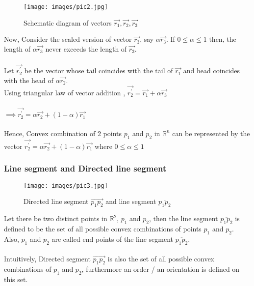 \documentclass{article}
\begin{document}
    \begin{figure}[h]
    \caption{Schematic diagram of vectors $\Vec{r_{1}}, \Vec{r_{2}}, \Vec{r_{3}}$}
    \centering
    \texttt{[image: images/pic2.jpg]}
    \end{figure}

    Now, Consider the scaled version of vector $\Vec{r_{3}}$, say $\alpha \Vec{r_{3}}$. If $0 \leq \alpha \leq 1$ then, the length of $\alpha \Vec{r_{3}}$ never exceeds  the length of $\Vec{r_{3}}$. \\ \\
    Let $\Vec{r^{'}_{2}}$ be the vector whose tail coincides with the tail of $\Vec{r_{1}}$ and head coincides with the head of $\alpha \Vec{r_{2}}$. \\ 
    Using triangular law of vector addition , $\Vec{r^{'}_{2}} = \Vec{r_{1}} + \alpha \Vec{r_{3}}$ \\ \\
    $\implies \Vec{r^{'}_{2}} = \alpha \Vec{r_{2}} + (1 - \alpha) \Vec{r_{1}}$ \\ \\
    Hence, Convex combination of 2 points $p_{1}$ and $p_{2}$ in $\mathbb{R}^{n}$ can be represented by the vector $\Vec{r^{'}_{2}} = \alpha \Vec{r_{2}} + (1 - \alpha) \Vec{r_{1}}$ where $0 \leq \alpha \leq 1$

    \subsubsection{Line segment and Directed line segment}
    
    \begin{figure}[h]
    \caption{Directed line segment $\overrightarrow{p_1p_2}$ and line segment $\overline{p_1p_2}$}
    \centering
    \texttt{[image: images/pic3.jpg]}
    \end{figure}
    
    Let there be two distinct points in $\mathbb{R}^{2}$, $p_{1}$ and $p_{2}$, then the line segment $\overline{p_{1} p_{2}}$ is defined to be the set of all possible convex combinations of points $p_{1}$ and $p_{2}$. Also, $p_{1}$ and $p_{2}$ are called end points of the line segment $\overline{p_{1} p_{2}}$. \\ \\    
    Intuitively, Directed segment $\overrightarrow{p_{1} p_{2}}$ is also the set of all possible convex combinations of $p_{1}$ and $p_{2}$, furthermore an order / an orientation is defined on this set. \\ \\
    
\end{document}

